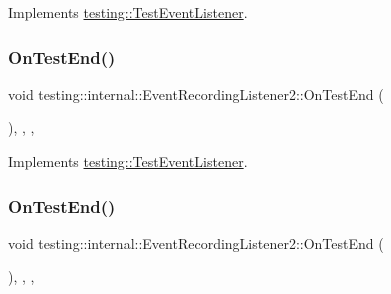 Implements \mbox{\hyperlink{classtesting_1_1_test_event_listener_a468b5e6701bcb86cb2c956caadbba5e4}{testing\+::\+Test\+Event\+Listener}}.

\mbox{\label{classtesting_1_1internal_1_1_event_recording_listener2_a8651cee935f60407bd65d0162a6d9629}} 
\subsubsection{\texorpdfstring{OnTestEnd()}{OnTestEnd()}\hspace{0.1cm}{\footnotesize\ttfamily [1/2]}}
{\footnotesize\ttfamily void testing\+::internal\+::\+Event\+Recording\+Listener2\+::\+On\+Test\+End (\begin{DoxyParamCaption}\item[{const \mbox{\hyperlink{classtesting_1_1_test_info}{Test\+Info}} \&}]{ }\end{DoxyParamCaption})\hspace{0.3cm}{\ttfamily [inline]}, {\ttfamily [override]}, {\ttfamily [protected]}, {\ttfamily [virtual]}}



Implements \mbox{\hyperlink{classtesting_1_1_test_event_listener_abb1c44525ef038500608b5dc2f17099b}{testing\+::\+Test\+Event\+Listener}}.

\mbox{\label{classtesting_1_1internal_1_1_event_recording_listener2_a8651cee935f60407bd65d0162a6d9629}} 
\subsubsection{\texorpdfstring{OnTestEnd()}{OnTestEnd()}\hspace{0.1cm}{\footnotesize\ttfamily [2/2]}}
{\footnotesize\ttfamily void testing\+::internal\+::\+Event\+Recording\+Listener2\+::\+On\+Test\+End (\begin{DoxyParamCaption}\item[{const \mbox{\hyperlink{classtesting_1_1_test_info}{Test\+Info}} \&}]{ }\end{DoxyParamCaption})\hspace{0.3cm}{\ttfamily [inline]}, {\ttfamily [override]}, {\ttfamily [protected]}, {\ttfamily [virtual]}}



